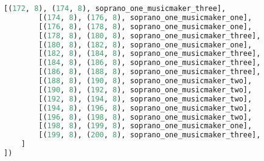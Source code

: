 \begin{lstlisting}[language=Python, caption=Invocation Source Code]
        [(172, 8), (174, 8), soprano_one_musicmaker_three],
        [(174, 8), (176, 8), soprano_one_musicmaker_one],
        [(176, 8), (178, 8), soprano_one_musicmaker_one],
        [(178, 8), (180, 8), soprano_one_musicmaker_three],
        [(180, 8), (182, 8), soprano_one_musicmaker_one],
        [(182, 8), (184, 8), soprano_one_musicmaker_three],
        [(184, 8), (186, 8), soprano_one_musicmaker_three],
        [(186, 8), (188, 8), soprano_one_musicmaker_three],
        [(188, 8), (190, 8), soprano_one_musicmaker_two],
        [(190, 8), (192, 8), soprano_one_musicmaker_two],
        [(192, 8), (194, 8), soprano_one_musicmaker_two],
        [(194, 8), (196, 8), soprano_one_musicmaker_two],
        [(196, 8), (198, 8), soprano_one_musicmaker_two],
        [(198, 8), (199, 8), soprano_one_musicmaker_one],
        [(199, 8), (200, 8), soprano_one_musicmaker_three],
    ]
])


\end{lstlisting}
